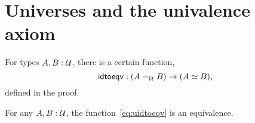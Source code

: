 \documentclass[hott-all.tex]{subfiles}
\begin{document}
\section{Universes and the univalence axiom}
\label{sec:compute-universe}
%
%
\begin{lem}\label{thm:idtoeqv}
  For types $A,B:\mathcal{U}$, there is a certain function,
  \begin{equation}\label{eq:uidtoeqv}
    \idtoeqv : (\id[\type]AB) \to (\eqv A B),
  \end{equation}
  defined in the proof.
\end{lem}
%
%
\begin{axiom}[Univalence]\label{axiom:univalence}
  For any $A,B:\mathcal{U}$, the function~\eqref{eq:uidtoeqv} is an equivalence.
\end{axiom}
\end{document}

